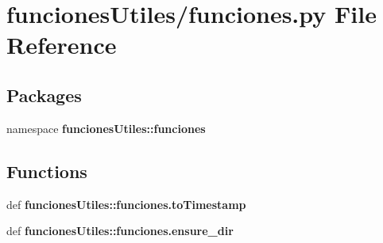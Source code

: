 \section{funciones\-Utiles/funciones.py \-File \-Reference}
\label{funciones_8py}
\subsection*{\-Packages}
\begin{DoxyCompactItemize}
\item 
namespace {\bf funciones\-Utiles\-::funciones}
\end{DoxyCompactItemize}
\subsection*{\-Functions}
\begin{DoxyCompactItemize}
\item 
def {\bf funciones\-Utiles\-::funciones.\-to\-Timestamp}
\item 
def {\bf funciones\-Utiles\-::funciones.\-ensure\-\_\-dir}
\end{DoxyCompactItemize}
